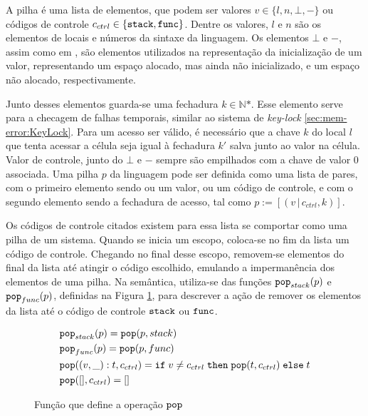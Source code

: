 A pilha é uma lista de elementos, que podem ser valores $v \in \{l, n, \bot, -\}$ ou códigos de controle $c_{ctrl} \in \{\texttt{stack},\texttt{func}\}$. Dentre os valores, $l$ e $n$ são os elementos de locais e números da sintaxe da linguagem. Os elementos $\bot$ e $-$, assim como em \citet{WESSEL2019}, são elementos utilizados na representação da inicialização de um valor, representando um espaço alocado, mas ainda não inicializado, e um espaço não alocado, respectivamente. 

Junto desses elementos guarda-se uma fechadura $k \in \mathbb{N}\text{*}$. Esse elemento serve para a checagem de falhas temporais, similar ao sistema de \emph{key-lock} \ref{sec:mem-error:KeyLock}. Para um acesso ser válido, é necessário que a chave $k$ do local $l$ que tenta acessar a célula seja igual à fechadura $k'$ salva junto ao valor na célula. Valor de controle, junto do $\bot$ e $-$ sempre são empilhados com a chave de valor 0 associada. Uma pilha $p$ da linguagem pode ser definida como uma lista de pares, com o primeiro elemento sendo ou um valor, ou um código de controle, e com o segundo elemento sendo a fechadura de acesso, tal como $p := [(v\,|\,c_{ctrl}, k)]$.

Os códigos de controle citados existem para essa lista se comportar como uma pilha de um sistema. Quando se inicia um escopo, coloca-se no fim da lista um código de controle. Chegando no final desse escopo, removem-se elementos do final da lista até atingir o código escolhido, emulando a impermanência dos elementos de uma pilha. Na semântica, utiliza-se das funções $\texttt{pop}_{stack}(p)$ e $\texttt{pop}_{func}(p)$, definidas na Figura \ref{fig:def:pop}, para descrever a ação de remover os elementos da lista até o código de controle $\texttt{stack}$ ou $\texttt{func}$. 

\begin{figure}[ht]
	\begin{align}
		&\texttt{pop}_{stack}(p) = \texttt{pop}(p, stack) \label{fig:def:pop1}\\
		&\texttt{pop}_{func}(p) = \texttt{pop}(p, func) \label{fig:def:pop2}\\
		&\texttt{pop}((v, \_) : t, c_{ctrl}) = \texttt{if} \; v \neq c_{ctrl} \;\texttt{then} \; \texttt{pop}(t, c_{ctrl}) \; \texttt{else} \; t  \label{fig:def:pop3}\\
		&\texttt{pop}([], c_{ctrl}) =  [] \label{fig:def:pop4}
	\end{align}
	\caption{Função que define a operação $\texttt{pop}$}
	\label{fig:def:pop}
\end{figure}

